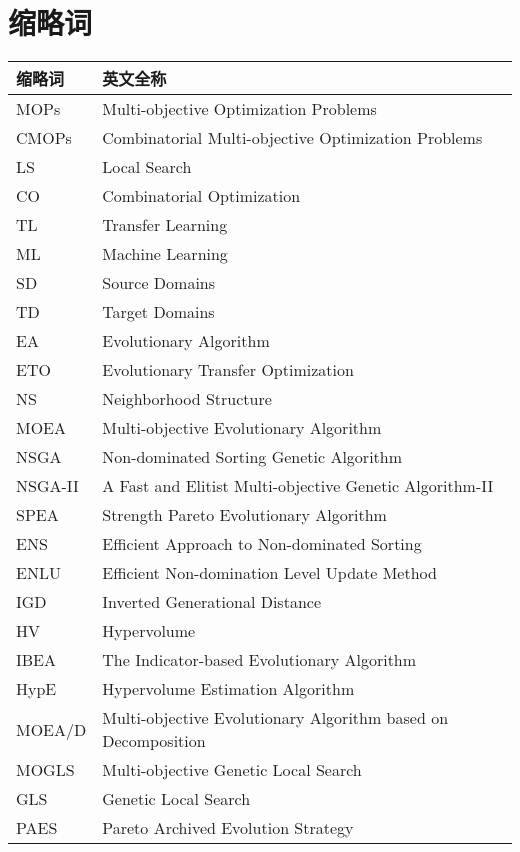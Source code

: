 \chapter*{缩略词}
\label{chap:缩略词}

\noindent\begin{longtabu} to \textwidth {|X[1,c]|X[4,c]|}\hline
缩略词 & 英文全称 \\ \hline
MOPs & Multi-objective Optimization Problems \\ \hline
CMOPs & Combinatorial Multi-objective Optimization Problems \\ \hline
LS & Local Search \\ \hline
CO & Combinatorial Optimization \\ \hline
TL & Transfer Learning \\ \hline
ML & Machine Learning \\ \hline
SD & Source Domains \\ \hline
TD & Target Domains \\ \hline
EA & Evolutionary Algorithm \\ \hline
ETO & Evolutionary Transfer Optimization \\ \hline
NS & Neighborhood Structure \\ \hline
MOEA & Multi-objective Evolutionary Algorithm \\ \hline
NSGA & Non-dominated Sorting Genetic Algorithm \\ \hline
NSGA-II & A Fast and Elitist Multi-objective Genetic Algorithm-II \\ \hline
SPEA & Strength Pareto Evolutionary Algorithm \\ \hline
ENS & Efficient Approach to Non-dominated Sorting \\ \hline
ENLU & Efficient Non-domination Level Update Method \\ \hline
IGD & Inverted Generational Distance \\ \hline
HV & Hypervolume \\ \hline
IBEA & The Indicator-based Evolutionary Algorithm \\ \hline
HypE & Hypervolume Estimation Algorithm \\ \hline
MOEA/D & Multi-objective Evolutionary Algorithm based on Decomposition \\ \hline
MOGLS & Multi-objective Genetic Local Search \\ \hline
GLS & Genetic Local Search \\ \hline
PAES & Pareto Archived Evolution Strategy \\ \hline

\end{longtabu}

